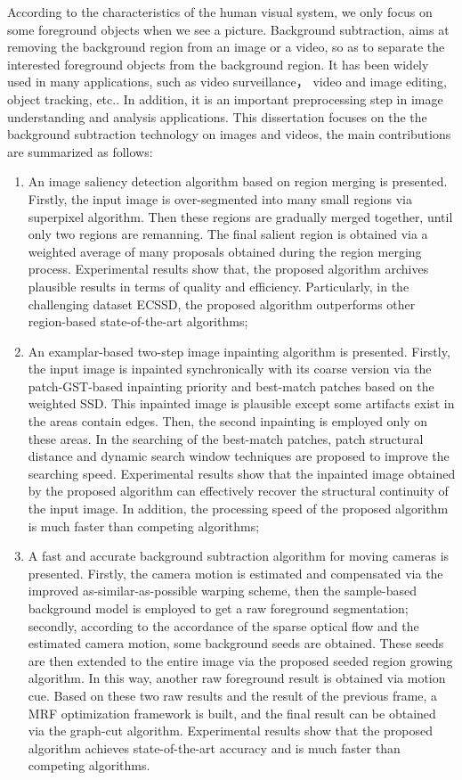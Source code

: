 \begin{eabstract}
   According to the characteristics of the human visual system, we only focus on some foreground objects when we see a picture. Background subtraction, aims at removing the background region from an image or a video, so as to separate the interested foreground objects from the background region. It has been widely used in many applications, such as video surveillance， video and image editing, object tracking, etc.. In addition, it is an important preprocessing step in image  understanding and analysis applications. This dissertation focuses on the the background subtraction technology on images and videos, the main contributions are summarized as follows:
   \begin{enumerate}
   \item An image saliency detection algorithm based on region merging is presented. Firstly, the input image is over-segmented into many small regions via superpixel algorithm. Then these regions are gradually merged together, until only two regions are remanning. The final salient region is obtained via a weighted average of many proposals obtained during the region merging process. Experimental results show that, the proposed algorithm archives plausible results in terms of quality and efficiency. Particularly, in the challenging dataset ECSSD, the proposed algorithm outperforms other region-based state-of-the-art algorithms;
   \item An examplar-based two-step image inpainting algorithm is presented. Firstly, the input image is inpainted synchronically with its coarse version via the patch-GST-based inpainting priority and best-match patches based on the weighted SSD. This inpainted image is plausible except some artifacts exist in the areas contain edges. Then, the second inpainting is employed only on these areas. In the searching of the best-match patches, patch structural distance and dynamic search window techniques are proposed to improve the searching speed. Experimental results show that the inpainted image obtained by the proposed algorithm can effectively recover the structural continuity of the input image. In addition, the processing speed of the proposed algorithm is much faster than competing algorithms;
   \item A fast and accurate background subtraction algorithm for moving cameras is presented. Firstly, the camera motion is estimated and compensated via the improved as-similar-as-possible warping scheme, then the sample-based background model is employed to get a raw foreground segmentation; secondly, according to the accordance of the sparse optical flow and the estimated camera motion, some background seeds are obtained. These seeds are then extended to the entire image via the proposed seeded region growing algorithm. In this way, another raw foreground result is obtained via motion cue. Based on these two raw results and the result of the previous frame, a MRF optimization framework is built, and the final result can be obtained via the graph-cut algorithm. Experimental results show that the proposed algorithm achieves state-of-the-art accuracy and is much faster than competing algorithms.


\end{enumerate}
\end{eabstract}
